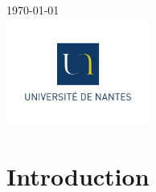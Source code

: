 \documentclass[12pt]{article}
\begin{document}
\begin{titlepage}

{\large \today}\\[2cm] %



\includegraphics[width=4.7cm]{logo.jpg}\\%


\newpage %

\end{titlepage}

\renewcommand{\contentsname}{Sommaire}
\tableofcontents
\newpage


\newcommand{\tab}{\hspace{1cm}}
\newcommand{\red}{\textcolor{red}}
\newcommand{\grn}{\textcolor{aogreen}}

\section{Introduction}
\label{sec:introduction}
\end{document}
